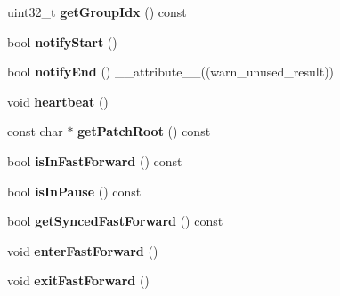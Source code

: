 \begin{DoxyCompactItemize}
\item 
\hypertarget{classProcessTreeNode_a2b7ca370831a0b647b52e8ef908e08ae}{uint32\-\_\-t {\bfseries get\-Group\-Idx} () const }\label{classProcessTreeNode_a2b7ca370831a0b647b52e8ef908e08ae}

\item 
\hypertarget{classProcessTreeNode_af42f3f697cb40a638e11ec922206a69e}{bool {\bfseries notify\-Start} ()}\label{classProcessTreeNode_af42f3f697cb40a638e11ec922206a69e}

\item 
\hypertarget{classProcessTreeNode_a6e9072197aed03980e448dbc5f851774}{bool {\bfseries notify\-End} () \-\_\-\-\_\-attribute\-\_\-\-\_\-((warn\-\_\-unused\-\_\-result))}\label{classProcessTreeNode_a6e9072197aed03980e448dbc5f851774}

\item 
\hypertarget{classProcessTreeNode_a7541e5e49b730a7c9ae5775c387a8cb6}{void {\bfseries heartbeat} ()}\label{classProcessTreeNode_a7541e5e49b730a7c9ae5775c387a8cb6}

\item 
\hypertarget{classProcessTreeNode_a2054dea12a92bb94d761f5733de60efd}{const char $\ast$ {\bfseries get\-Patch\-Root} () const }\label{classProcessTreeNode_a2054dea12a92bb94d761f5733de60efd}

\item 
\hypertarget{classProcessTreeNode_a7deae7f3565b6e87b2f209a9983d9f98}{bool {\bfseries is\-In\-Fast\-Forward} () const }\label{classProcessTreeNode_a7deae7f3565b6e87b2f209a9983d9f98}

\item 
\hypertarget{classProcessTreeNode_a0bdc9036d26d48e7dce73ee80f9bf44a}{bool {\bfseries is\-In\-Pause} () const }\label{classProcessTreeNode_a0bdc9036d26d48e7dce73ee80f9bf44a}

\item 
\hypertarget{classProcessTreeNode_a5cc9ac7217b92e33142cedf9c94daf40}{bool {\bfseries get\-Synced\-Fast\-Forward} () const }\label{classProcessTreeNode_a5cc9ac7217b92e33142cedf9c94daf40}

\item 
\hypertarget{classProcessTreeNode_af0f14d6530f1ad19ff7af6b321e894f2}{void {\bfseries enter\-Fast\-Forward} ()}\label{classProcessTreeNode_af0f14d6530f1ad19ff7af6b321e894f2}

\item 
\hypertarget{classProcessTreeNode_a09d1b9ef0e2c10b85753f7b8b2344e9e}{void {\bfseries exit\-Fast\-Forward} ()}\label{classProcessTreeNode_a09d1b9ef0e2c10b85753f7b8b2344e9e}


\end{DoxyCompactItemize}
